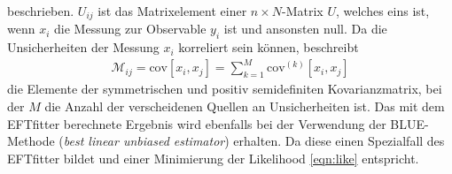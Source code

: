 beschrieben. $U_{ij}$ ist das Matrixelement einer $n \times N$-Matrix $U$, welches eins ist, wenn $x_i$ die Messung zur Observable $y_i$ ist und ansonsten null. Da die Unsicherheiten der Messung $x_i$ korreliert sein können, beschreibt
\begin{align}
  \mathcal{M}_{ij} = \text{cov}[x_i, x_j] = \sum_{k=1}^{M} \text{cov}^{(k)}[x_i, x_j]
\end{align}
die Elemente der symmetrischen und positiv semidefiniten Kovarianzmatrix, bei der $M$ die Anzahl der verscheidenen Quellen an Unsicherheiten ist. Das mit dem EFTfitter berechnete Ergebnis wird ebenfalls bei der Verwendung der BLUE-Methode (\textit{best linear unbiased estimator})\cite{LYONS1988110} erhalten. Da diese einen Spezialfall des EFTfitter bildet und einer Minimierung der Likelihood \eqref{eqn:like} entspricht.

